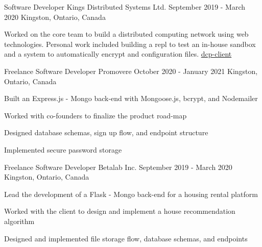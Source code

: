 

\begin{cventries}

  \cventry
    {Software Developer} %
    {Kings Distributed Systems Ltd.} %
    {September 2019 - March 2020} %
    {Kingston, Ontario, Canada} %
    {
      \begin{cvitems} %
        \item {Worked on the core team to build a distributed computing network using web technologies. Personal work included building a repl to test an in-house sandbox and a system to automatically encrypt and configuration files. \href{https://www.npmjs.com/package/dcp-client}{dcp-client}}
      \end{cvitems}
    }

  \cventry
    {Freelance Software Developer} %
    {Promovere} %
    {October 2020 - January 2021} %
    {Kingston, Ontario, Canada} %
    {
      \begin{cvitems} %
        \item {Built an Express.js - Mongo back-end with Mongoose.js, bcrypt, and Nodemailer}
        \item{Worked with co-founders to finalize the product road-map}
        \item{Designed database schemas, sign up flow, and endpoint structure}
        \item{Implemented secure password storage}
      \end{cvitems}
    }

  \cventry
    {Freelance Software Developer} %
    {Betalab Inc.} %
    {September 2019 - March 2020} %
    {Kingston, Ontario, Canada} %
    {
      \begin{cvitems} %
        \item {Lead the development of a Flask - Mongo back-end for a housing rental platform} %
        \item{Worked with the client to design and implement a house recommendation algorithm}
        \item{Designed and implemented file storage flow, database schemas, and endpoints}
      \end{cvitems}
    }


\end{cventries}
